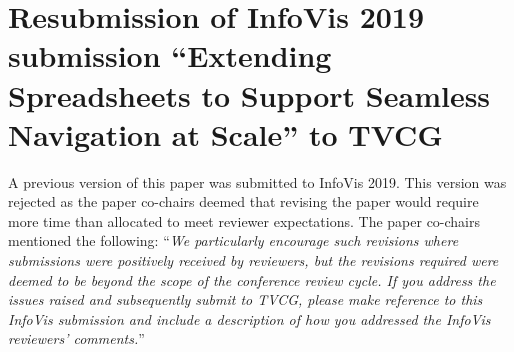 

\section*{Resubmission of InfoVis 2019 submission ``Extending Spreadsheets to Support Seamless
Navigation at Scale'' to TVCG}

A previous version of this paper was submitted to InfoVis 2019. This version was rejected as the paper co-chairs deemed that revising the paper would require more time than allocated to meet reviewer expectations. The paper co-chairs mentioned the following: ``\textit{We particularly encourage such revisions where submissions were positively received by reviewers, but the revisions required were deemed to be beyond the scope of the conference review cycle. If you address the issues raised and subsequently submit to TVCG, please make reference to this  InfoVis submission and include a description of how you addressed the InfoVis reviewers' comments.}'' 

